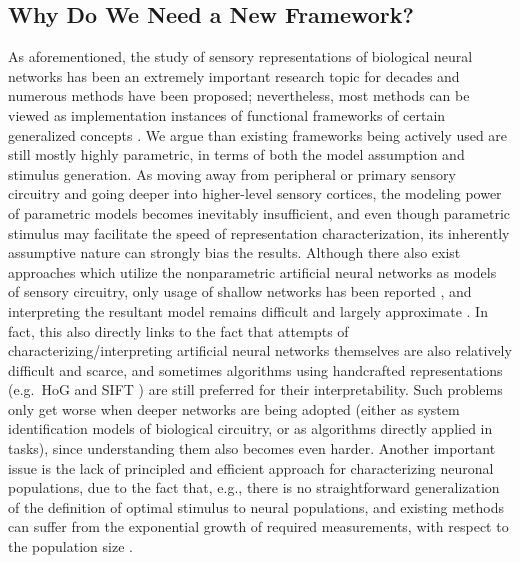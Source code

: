 
\subsection*{Why Do We Need a New Framework?} %

As aforementioned, the study of sensory representations of biological neural networks has been an extremely important research topic for decades and numerous methods have been proposed; nevertheless, most methods can be viewed as implementation instances of functional frameworks of certain generalized concepts \cite{wu2006complete, dimattina2013adaptive}. We argue than existing frameworks being actively used are still mostly highly parametric, in terms of both the model assumption and stimulus generation. As moving away from peripheral or primary sensory circuitry and going deeper into higher-level sensory cortices, the modeling power of parametric models becomes inevitably insufficient, and even though parametric stimulus may facilitate the speed of representation characterization, its inherently assumptive nature can strongly bias the results. Although there also exist approaches which utilize the nonparametric artificial neural networks as models of sensory circuitry, only usage of shallow networks has been reported \cite{lau2002computational, prenger2004nonlinear}, and interpreting the resultant model remains difficult and largely approximate \cite{wu2006complete}. In fact, this also directly links to the fact that attempts of characterizing/interpreting artificial neural networks themselves are also relatively difficult and scarce, and sometimes algorithms using handcrafted representations (e.g.~HoG and SIFT \cite{szeliski2010computer}) are still preferred for their interpretability. Such problems only get worse when deeper networks are being adopted (either as system identification models of biological circuitry, or as algorithms directly applied in tasks), since understanding them also becomes even harder. Another important issue is the lack of principled and efficient approach for characterizing neuronal populations, due to the fact that, e.g., there is no straightforward generalization of the definition of optimal stimulus to neural populations, and existing methods can suffer from the exponential growth of required measurements, with respect to the population size \cite{dimattina2013adaptive}.

